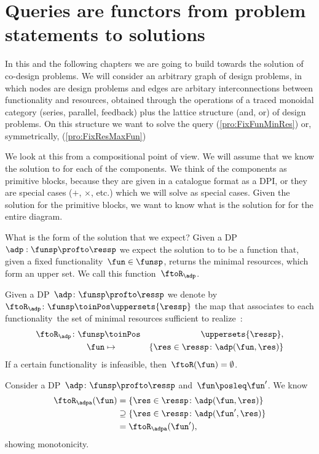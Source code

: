 \section{Queries are functors from problem statements to solutions}

In this and the following chapters we are going to build towards the solution of co-design problems.
We will consider an arbitrary graph of design problems, in which nodes are design problems and edges are arbitary interconnections between functionality and resources, obtained through the operations of a traced monoidal category (series, parallel, feedback) plus the lattice structure (and, or) of design problems. On this structure we want to solve the query \FixFunMinRes (\cref{pro:FixFunMinRes}) or, symmetrically, \FixResMaxFun (\cref{pro:FixResMaxFun})


We look at this from a compositional point of view. We will assume that we know the solution to \FixFunMinRes for each of the components. We think of the components as primitive blocks, because they are given in a catalogue format as a DPI, or they are special cases ($+$, $\times$, etc.) which we will solve as special cases.  Given the solution for the primitive blocks, we want to know what is the solution for \FixFunMinRes for the entire diagram.

What is the form of the solution that we expect? Given a DP $\adp: \funsp \profto \ressp$ we expect the solution to \FixFunMinRes to be a function that, given a fixed functionality~$\fun\in\funsp$, returns the minimal resources, which form an upper set. We call this function~$\ftoR_\adp$.

\begin{definition}
  \label{def:ftoR-dp}
  Given a DP~$\adp\colon\funsp\profto\ressp$
  we denote by~$\ftoR_{\adp}\colon \funsp\toinPos \uppersets{\ressp}$ the map that associates
  to each functionality~\fun the set of minimal resources sufficient to realize~\fun:
  \begin{eqnarray*}
    \ftoR_{\adp}\colon \funsp & \toinPos & \uppersets{\ressp},\\
    \fun& \mapsto & \{ \res \in \ressp \colon \adp(\fun, \res)\}
  \end{eqnarray*}
  If a certain functionality~\fun is infeasible, then~$\ftoR(\fun)=\emptyset$.
\end{definition}

\begin{remark}[Monotonicity]
    Consider a DP~$\adp\colon\funsp\profto\ressp$ and~$\fun\posleq \fun'$. We know
    \begin{equation*}
        \begin{aligned}
            \ftoR_\adpa(\fun)&=\{ \res \in \ressp \colon \adp(\fun, \res)\} \\
            &\supseteq \{ \res \in \ressp \colon \adp(\fun', \res)\}\\
            &=\ftoR_\adpa(\fun'),
        \end{aligned}
    \end{equation*}
    showing monotonicity.
\end{remark}


